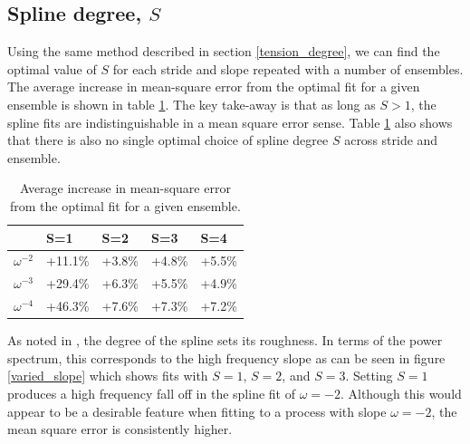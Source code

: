 \documentclass[10pt,journal]{IEEEtran}
\begin{document}

\subsection{Spline degree, $S$} \label{spline_degree}

Using the same method described in section \ref{tension_degree}, we can find the optimal value of $S$ for each stride and slope repeated with a number of ensembles. The average increase in mean-square error from the optimal fit for a given ensemble is shown in table \ref{optimal_S}. The key take-away is that as long as $S > 1$, the spline fits are indistinguishable in a mean square error sense. Table \ref{optimal_S} also shows that there is also no single optimal choice of spline degree $S$ across stride and ensemble.

\begin{table}[ht]
\caption{Average increase in mean-square error from the optimal fit for a given ensemble.}
\label{optimal_S}
\centering
\begin{tabular}{r | llll}  & S=1 & S=2 & S=3 & S=4 \\ \hline \hline 
$\omega^{-2}$ & +11.1\% & +3.8\% & +4.8\% & +5.5\%  \\ 
$\omega^{-3}$ & +29.4\% & +6.3\% & +5.5\% & +4.9\%  \\ 
$\omega^{-4}$ & +46.3\% & +7.6\% & +7.3\% & +7.2\%  \\ 
\end{tabular} 
\end{table}

As noted in \cite{craven1979-nm}, the degree of the spline sets its roughness. In terms of the power spectrum, this corresponds to the high frequency slope as can be seen in figure \ref{varied_slope} which shows fits with $S=1$, $S=2$, and $S=3$. Setting $S=1$ produces a high frequency fall off in the spline fit of $\omega=-2$. Although this would appear to be a desirable feature when fitting to a process with slope $\omega=-2$, the mean square error is consistently higher.
\end{document}
